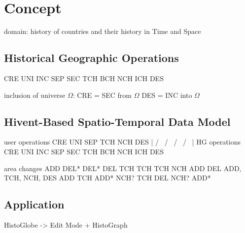 
\section{Concept} %
\label{sec:concept}

domain: history of countries and their history in Time and Space


\subsection{Historical Geographic Operations} %
\label{sub:historical_geographic_operations}

CRE
UNI
INC
SEP
SEC
TCH
BCH
NCH
ICH
DES



inclusion of universe $\Omega$:
CRE = SEC from $\Omega$
DES = INC into $\Omega$



\subsection{Hivent-Based Spatio-Temporal Data Model} %
\label{sub:hivent_based_spatio_temporal_data_model}

user operations     CRE     UNI          SEP         TCH         NCH      DES
                     |      / \         /   \        /  \       /   \      |
HG operations       CRE   UNI   INC   SEP   SEC   TCH   BCH   NCH   ICH   DES

area changes        ADD   DEL*  DEL*  DEL   TCH   TCH   TCH   NCH   ADD   DEL
ADD, TCH, NCH, DES        ADD   TCH   ADD*  NCH?        TCH         DEL
                                NCH?        ADD*







\subsection{Application} %
\label{sub:application}

HistoGlobe -> Edit Mode + HistoGraph



